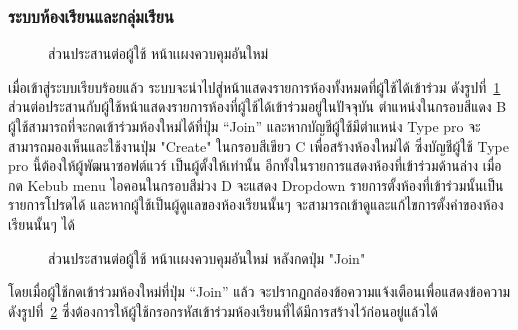 \documentclass[12pt,one side,openright,a4paper]{cpe-thesis-th}
\newcommand{\thaijustify}[1]{%
  \par\hspace{30pt}\justifying
  #1
}
\begin{document}
\subsubsection{ระบบห้องเรียนและกลุ่มเรียน}
\begin{figure}[H]
  \centering
  \caption[ส่วนประสานต่อผู้ใช้ หน้าเเผงควบคุมอันใหม่]{ส่วนประสานต่อผู้ใช้ หน้าเเผงควบคุมอันใหม่}\label{fig:new-ui-dashboard1}
\end{figure}

\thaijustify{
  เมื่อเข้าสู่ระบบเรียบร้อยแล้ว ระบบจะนำไปสู่หน้าแสดงรายการห้องทั้งหมดที่ผู้ใช้ได้เข้าร่วม ดังรูปที่~\ref{fig:new-ui-dashboard1} ส่วนต่อประสานกับผู้ใช้หน้าแสดงรายการห้องที่ผู้ใช้ได้เข้าร่วมอยู่ในปัจจุบัน ตำแหน่งในกรอบสีแดง B ผู้ใช้สามารถที่จะกดเข้าร่วมห้องใหม่ได้ที่ปุ่ม “Join” และหากบัญชีผู้ใช้มีตำแหน่ง Type pro จะสามารถมองเห็นและใช้งานปุ่ม "Create" ในกรอบสีเขียว C เพื่อสร้างห้องใหม่ได้ ซึ่งบัญชีผู้ใช้ Type pro นี้ต้องให้ผู้พัฒนาซอฟต์แวร์ เป็นผู้ตั้งให้เท่านั้น อีกทั้งในรายการแสดงห้องที่เข้าร่วมด้านล่าง เมื่อกด Kebub menu ไอคอนในกรอบสีม่วง D จะแสดง Dropdown รายการตั้งห้องที่เข้าร่วมนั้นเป็นรายการโปรดได้ และหากผู้ใช้เป็นผู้ดูแลของห้องเรียนนั้นๆ จะสามารถเข้าดูและแก้ไขการตั้งค่าของห้องเรียนนั้นๆ ได้
}
\begin{figure}[H]
  \centering
  \caption[ส่วนประสานต่อผู้ใช้ หน้าเเผงควบคุมอันใหม่ (กดปุ่ม "Join")]{ส่วนประสานต่อผู้ใช้ หน้าเเผงควบคุมอันใหม่ หลังกดปุ่ม "Join"}\label{fig:new-ui-dashboard2}
\end{figure}
\thaijustify{
  โดยเมื่อผู้ใช้กดเข้าร่วมห้องใหม่ที่ปุ่ม “Join” แล้ว จะปรากฏกล่องข้อความแจ้งเตือนเพื่อแสดงข้อความ ดังรูปที่~\ref{fig:new-ui-dashboard2} ซึ่งต้องการให้ผู้ใช้กรอกรหัสเข้าร่วมห้องเรียนที่ได้มีการสร้างไว้ก่อนอยู่แล้วได้
}
\end{document}
